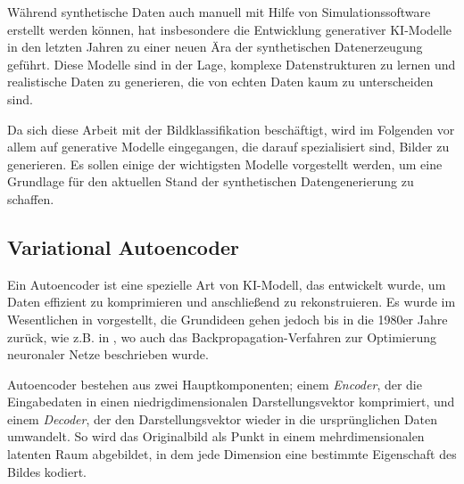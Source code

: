 Während synthetische Daten auch manuell mit Hilfe von Simulationssoftware erstellt werden können, hat insbesondere die Entwicklung generativer KI-Modelle in den letzten Jahren zu einer neuen Ära der synthetischen Datenerzeugung geführt. Diese Modelle sind in der Lage, komplexe Datenstrukturen zu lernen und realistische Daten zu generieren, die von echten Daten kaum zu unterscheiden sind.

Da sich diese Arbeit mit der Bildklassifikation beschäftigt, wird im Folgenden vor allem auf generative Modelle eingegangen, die darauf spezialisiert sind, Bilder zu generieren. Es sollen einige der wichtigsten Modelle vorgestellt werden, um eine Grundlage für den aktuellen Stand der synthetischen Datengenerierung zu schaffen.

\subsection{Variational Autoencoder} \label{subsec:vae}

Ein Autoencoder ist eine spezielle Art von KI-Modell, das entwickelt wurde, um Daten effizient zu komprimieren und anschließend zu rekonstruieren. Es wurde im Wesentlichen in \parencite{Hinton2006autoencoder} vorgestellt, die Grundideen gehen jedoch bis in die 1980er Jahre zurück, wie z.B. in \parencite{Rumelhart1986backpropagation}, wo auch das Backpropagation-Verfahren zur Optimierung neuronaler Netze beschrieben wurde.

Autoencoder bestehen aus zwei Hauptkomponenten; einem \emph{Encoder}, der die Eingabedaten in einen niedrigdimensionalen Darstellungsvektor komprimiert, und einem \emph{Decoder}, der den Darstellungsvektor wieder in die ursprünglichen Daten umwandelt. So wird das Originalbild als Punkt in einem mehrdimensionalen latenten Raum abgebildet, in dem jede Dimension eine bestimmte Eigenschaft des Bildes kodiert.

